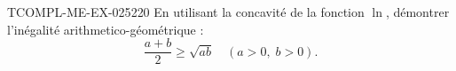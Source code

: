 \begin{exercice}{TCOMPL-ME-EX-025}{2}{20}
En utilisant la concavité de la fonction $\ln$, démontrer l'inégalité arithmetico-géométrique :
\[ \frac{a+b}{2} \geq \sqrt{ab} \quad (a > 0,\; b > 0). \]

\end{exercice}
